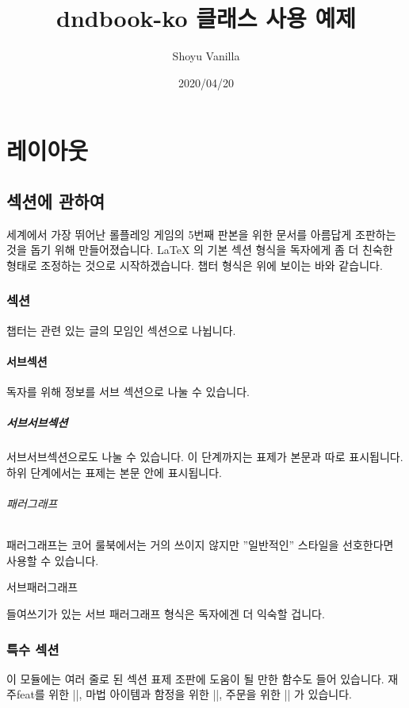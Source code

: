 \documentclass[letterpaper,twocolumn,openany,nodeprecatedcode]{dndbook-ko}
\title{dndbook-ko 클래스 사용 예제}
\author{Shoyu Vanilla}
\date{2020/04/20}
\begin{document}
\frontmatter

\maketitle

\tableofcontents

\mainmatter%

\part{레이아웃}

\chapter{섹션에 관하여}

 세계에서 가장 뛰어난 롤플레잉 게임의 5번째 판본을 위한 문서를 아름답게 조판하는 것을 돕기 위해 만들어졌습니다. \LaTeX{} 의 기본 섹션 형식을 독자에게 좀 더 친숙한 형태로 조정하는 것으로 시작하겠습니다. 챕터 형식은 위에 보이는 바와 같습니다.


\section{섹션}
챕터는 관련 있는 글의 모임인 섹션으로 나뉩니다.

\subsection{서브섹션 }
독자를 위해 정보를 서브 섹션으로 나눌 수 있습니다.

\subsubsection{서브서브섹션 }
서브서브섹션으로도 나눌 수 있습니다. 이 단계까지는 표제가 본문과 따로 표시됩니다. 하위 단계에서는 표제는 본문 안에 표시됩니다.

\paragraph{패러그래프}
패러그래프는 코어 룰북에서는 거의 쓰이지 않지만 ''일반적인'' 스타일을 선호한다면 사용할 수 있습니다.

\subparagraph{서브패러그래프}
들여쓰기가 있는 서브 패러그래프 형식은 독자에겐 더 익숙할 겁니다.

\section{특수 섹션}
이 모듈에는 여러 줄로 된 섹션 표제 조판에 도움이 될 만한 함수도 들어 있습니다. 재주feat를 위한 |\DndFeatHeader|, 마법 아이템과 함정을 위한 |\DndItemHeader|, 주문을 위한 |\DndSpellHeader| 가 있습니다.
\end{document}
